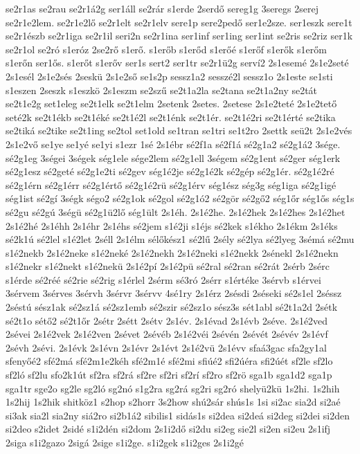 {se2r1as
se2rau
se2r1á2g
ser1áll
se2rár
s1erde
2serdő
sereg1g
3seregs
2serej
se2r1e2lem.
se2r1e2lő
se2r1elt
se2r1elv
sere1p
sere2pedő
ser1e2sze.
ser1eszk
sere1t
se2r1észb
se2r1iga
se2r1il
seri2n
se2r1ina
ser1inf
ser1ing
ser1int
se2ris
se2riz
ser1k
se2r1ol
se2ró
s1eróz
2se2rő
s1erő.
s1erőb
s1erőd
s1erőé
s1erőf
s1erők
s1erőm
s1erőn
ser1ős.
s1erőt
s1erőv
ser1s
sert2
ser1tr
se2r1ü2g
serví2
2s1esemé
2s1e2seté
2s1esél
2s1e2sés
2seskü
2s1e2ső
se1s2p
sessz1a2
sesszé2l
sessz1o
2s1este
se1sti
s1eszen
2seszk
s1eszkö
2s1eszm
se2szű
se2t1a2la
se2tana
se2t1a2ny
se2tát
se2t1e2g
set1eleg
se2t1elk
se2t1elm
2setenk
2setes.
2setese
2s1e2teté
2s1e2tető
seté2k
se2t1ékb
se2t1éké
se2t1é2l
se2t1énk
se2t1ér.
se2t1é2ri
se2t1érté
se2tika
se2tiká
se2tike
se2t1ing
se2tol
set1old
se1tran
se1tri
se1t2ro
2settk
seü2t
2s1e2vés
2s1e2vő
se1ye
se1yé
se1yi
s1ezr
1sé
2s1ébr
sé2f1a
sé2f1á
sé2g1a2
sé2g1á2
3sége.
sé2g1eg
3ségei
3ségek
ség1ele
sége2lem
sé2g1ell
3ségem
sé2g1ent
sé2ger
ség1erk
sé2g1esz
sé2geté
sé2g1e2ti
sé2gev
ség1é2je
sé2g1é2k
sé2gép
sé2g1ér.
sé2g1é2ré
sé2g1érn
sé2g1érr
sé2g1értő
sé2g1é2rü
sé2g1érv
ség1ész
ség3g
ség1iga
sé2g1igé
ség1ist
sé2gí
3ségk
ségo2
sé2g1ok
sé2gol
sé2g1ó2
sé2gör
sé2gő2
ség1őr
ség1ős
ség1s
sé2gu
sé2gú
3ségü
sé2g1ü2lő
ség1ült
2s1éh.
2s1é2he.
2s1é2hek
2s1é2hes
2s1é2het
2s1é2hé
2s1éhh
2s1éhr
2s1éhs
sé2jem
s1é2ji
s1éjs
sé2kek
s1ékho
2s1ékm
2s1éks
sé2k1ú
sé2lel
s1é2let
2séll
2s1élm
sélőkész1
sé2lű
2sély
sé2lya
sé2lyeg
3sémá
sé2mu
s1é2nekb
2s1é2neke
s1é2neké
2s1é2nekh
2s1é2neki
s1é2nekk
2sénekl
2s1é2nekn
s1é2nekr
s1é2nekt
s1é2nekü
2s1é2pí
2s1é2pü
sé2ral
sé2ran
sé2rát
2sérb
2sérc
s1érde
sé2réé
sé2rie
sé2rig
s1érlel
2sérm
sé3ró
2sérr
s1értéke
3sérvb
s1érvei
3sérvem
3sérves
3sérvh
3sérvr
3sérvv
4sé1ry
2s1érz
2sésdi
2séseki
sé2s1el
2séssz
2séstú
sész1ak
sé2sz1á
sé2sz1emb
sé2szir
sé2sz1o
sész3s
sét1abl
sé2t1a2d
2sétk
sé2t1o
sétő2
sé2t1őr
2sétr
2sétt
2sétv
2s1év.
2s1évad
2s1évb
2séve.
2s1é2ved
2sévei
2s1é2vek
2s1é2ven
2sévet
2sévéb
2s1é2véi
2sévén
2sévét
2sévév
2s1évf
2sévh
2sévi.
2s1évk
2s1évn
2s1évr
2s1évt
2s1é2vü
2s1évv
sfaá3gac
sfa2gy1al
sfenyőé2
sfé2má
sfé2m1e2kéh
sfé2m1é
sfé2mi
sfiúé2
sfi2úéra
sfi2úét
sf2le
sf2lo
sf2ló
sf2lu
sfo2k1út
sf2ra
sf2rá
sf2re
sf2ri
sf2rí
sf2ro
sf2rö
sga1b
sga1d2
sga1p
sga1tr
sge2o
sg2le
sg2ló
sg2nó
s1g2ra
sg2rá
sg2ri
sg2ró
shelyü2kü
1s2hi.
1s2hih
1s2hij
1s2hik
shitköz1
s2hop
s2horr
3s2how
shú2sár
shús1s
1si
si2ac
sia2d
si2aé
si3ak
sia2l
sia2ny
siá2ro
si2b1á2
sibilis1
sidás1s
si2dea
si2deá
si2deg
si2dei
si2den
si2deo
s2idet
2sidé
s1i2dén
si2dom
2s1i2dő
si2du
si2eg
sie2l
si2en
si2eu
2s1ifj
2siga
s1i2gazo
2sigá
2sige
s1i2ge.
s1i2gek
s1i2ges
2s1i2gé
}
